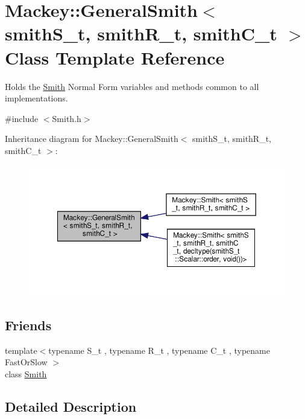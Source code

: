 \hypertarget{classMackey_1_1GeneralSmith}{}\section{Mackey\+:\+:General\+Smith$<$ smith\+S\+\_\+t, smith\+R\+\_\+t, smith\+C\+\_\+t $>$ Class Template Reference}
\label{classMackey_1_1GeneralSmith}


Holds the \hyperlink{classMackey_1_1Smith}{Smith} Normal Form variables and methods common to all implementations.  




{\ttfamily \#include $<$Smith.\+h$>$}



Inheritance diagram for Mackey\+:\+:General\+Smith$<$ smith\+S\+\_\+t, smith\+R\+\_\+t, smith\+C\+\_\+t $>$\+:\nopagebreak
\begin{figure}[H]
\begin{center}
\leavevmode
\includegraphics[width=350pt]{classMackey_1_1GeneralSmith__inherit__graph}
\end{center}
\end{figure}
\subsection*{Friends}
\begin{DoxyCompactItemize}
\item 
{\footnotesize template$<$typename S\+\_\+t , typename R\+\_\+t , typename C\+\_\+t , typename Fast\+Or\+Slow $>$ }\\class \hyperlink{classMackey_1_1GeneralSmith_aa10f0f4c3408f3557b07883e86efc88a}{Smith}
\end{DoxyCompactItemize}


\subsection{Detailed Description}
